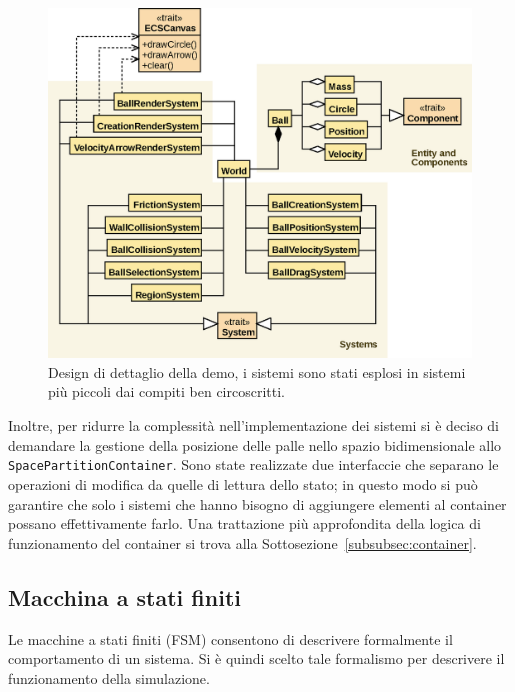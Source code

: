 \begin{figure}[H]
    \centering
    \includegraphics[width=\textwidth]{./img/Demo}
    \caption{Design di dettaglio della demo, i sistemi sono stati esplosi in sistemi più piccoli dai compiti ben circoscritti.}
    \label{fig:demo-detail}
\end{figure}

Inoltre, per ridurre la complessità nell'implementazione dei sistemi si è deciso di demandare la gestione della
posizione delle palle nello spazio bidimensionale allo \texttt{SpacePartitionContainer}.
Sono state realizzate due interfaccie che separano le operazioni di modifica da quelle di lettura dello stato;
in questo modo si può garantire che solo i sistemi che hanno bisogno di aggiungere elementi al container possano
effettivamente farlo.
Una trattazione più approfondita della logica di funzionamento del container si trova alla
Sottosezione~\ref{subsubsec:container}.

\subsection{Macchina a stati finiti}\label{subsec:macchina-a-stati-finiti}
Le macchine a stati finiti (FSM) consentono di descrivere formalmente il comportamento di un sistema.
Si è quindi scelto tale formalismo per descrivere il funzionamento della simulazione.

